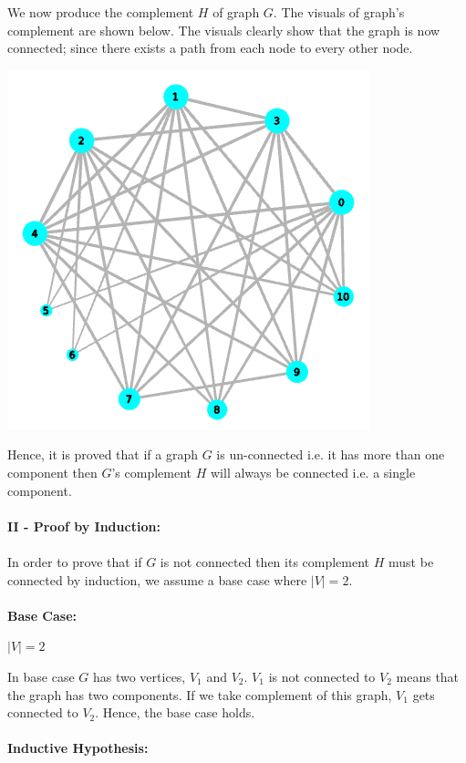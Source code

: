 \documentclass[addpoints]{exam}
\begin{document}
\begin{questions}
\begin{solution}
\begin{center}
	\end{center}
\pagebreak
	We now produce the complement $H$ of graph $G$. The visuals of graph's complement are shown below. The visuals clearly show that the graph is now connected; since there exists a path from each node to every other node. 
	\begin{center}
		\includegraphics[scale=0.8]{complement_graph_2}\\
	\end{center}
	Hence, it is proved that if a graph $G$ is un-connected i.e. it has more than one component then $G$'s complement $H$ will always be connected i.e. a single component. \\ \\
	\textbf{II - Proof by Induction:}\\ \\
	In order to prove that if $G$ is not connected then its complement $H$ must be connected by induction, we assume a base case where $\left|V\right|=2$. \\ \\
	\textbf{Base Case:}
	\begin{center}
		$\left|V\right|=2$
	\end{center} 
	In base case $G$ has two vertices, $V_1$ and $V_2$. $V_1$ is not connected to $V_2$ means that the graph has two components. If we take complement of this graph, $V_1$ gets connected to $V_2$. Hence, the base case holds. \\ \\
	\textbf{Inductive Hypothesis:}\\

\end{solution}
\end{questions}
\end{document}

